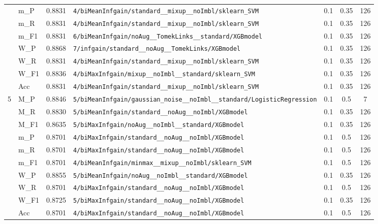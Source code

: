 \begin{table}[htbp]
\begin{tabular}{|c|l|c|>{\ttfamily\footnotesize}p{7.2cm}|c|c|c|}
 & m\_P & 0.8831 & \texttt{4/biMeanInfgain/standard\_\_mixup\_\_noImbl/sklearn\_SVM} & 0.1 & 0.35  & 126 \\ 
 & m\_R & 0.8831 & \texttt{4/biMeanInfgain/standard\_\_mixup\_\_noImbl/sklearn\_SVM} & 0.1 & 0.35  & 126 \\ 
 & m\_F1 & 0.8831 & \texttt{6/biMeanInfgain/noAug\_\_TomekLinks\_\_standard/XGBmodel} & 0.1 & 0.35  & 126 \\ 
 & W\_P & 0.8868 & \texttt{7/infgain/standard\_\_noAug\_\_TomekLinks/XGBmodel} & 0.1 & 0.35  & 126 \\ 
 & W\_R & 0.8831 & \texttt{4/biMeanInfgain/standard\_\_mixup\_\_noImbl/sklearn\_SVM} & 0.1 & 0.35  & 126 \\ 
 & W\_F1 & 0.8836 & \texttt{4/biMaxInfgain/mixup\_\_noImbl\_\_standard/sklearn\_SVM} & 0.1 & 0.35  & 126 \\ 
 & Acc & 0.8831 & \texttt{4/biMeanInfgain/standard\_\_mixup\_\_noImbl/sklearn\_SVM} & 0.1 & 0.35  & 126 \\ 
\hline
\multirow{10}{*}{5} & M\_P & 0.8846 & \texttt{5/biMeanInfgain/gaussian\_noise\_\_noImbl\_\_standard/LogisticRegression} & 0.1 & 0.5  & 7 \\ 
 & M\_R & 0.8830 & \texttt{5/biMeanInfgain/standard\_\_noAug\_\_noImbl/XGBmodel} & 0.1 & 0.35  & 126 \\ 
 & M\_F1 & 0.8635 & \texttt{5/biMaxInfgain/noAug\_\_noImbl\_\_standard/XGBmodel} & 0.1 & 0.35  & 126 \\ 
 & m\_P & 0.8701 & \texttt{4/biMaxInfgain/standard\_\_noAug\_\_noImbl/XGBmodel} & 0.1 & 0.5  & 126 \\ 
 & m\_R & 0.8701 & \texttt{4/biMaxInfgain/standard\_\_noAug\_\_noImbl/XGBmodel} & 0.1 & 0.5  & 126 \\ 
 & m\_F1 & 0.8701 & \texttt{4/biMeanInfgain/minmax\_\_mixup\_\_noImbl/sklearn\_SVM} & 0.1 & 0.5  & 126 \\ 
 & W\_P & 0.8855 & \texttt{5/biMeanInfgain/noAug\_\_noImbl\_\_standard/XGBmodel} & 0.1 & 0.35  & 126 \\ 
 & W\_R & 0.8701 & \texttt{4/biMaxInfgain/standard\_\_noAug\_\_noImbl/XGBmodel} & 0.1 & 0.5  & 126 \\ 
 & W\_F1 & 0.8725 & \texttt{5/biMaxInfgain/standard\_\_noAug\_\_noImbl/XGBmodel} & 0.1 & 0.35  & 126 \\ 
 & Acc & 0.8701 & \texttt{4/biMaxInfgain/standard\_\_noAug\_\_noImbl/XGBmodel} & 0.1 & 0.5  & 126 \\ 
\hline
\end{tabular}
\end{table}
